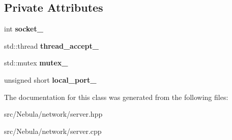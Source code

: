 \subsection*{\-Private \-Attributes}
\begin{DoxyCompactItemize}
\item 
\hypertarget{classgal_1_1network_1_1server_ab30387fed262865c5b4fdaf31127e03f}{int {\bfseries socket\-\_\-}}\label{classgal_1_1network_1_1server_ab30387fed262865c5b4fdaf31127e03f}

\item 
\hypertarget{classgal_1_1network_1_1server_ac269b4e460b0907bb6c12e400bd35b4f}{std\-::thread {\bfseries thread\-\_\-accept\-\_\-}}\label{classgal_1_1network_1_1server_ac269b4e460b0907bb6c12e400bd35b4f}

\item 
\hypertarget{classgal_1_1network_1_1server_aa431c88e212e3d616be9e94f9701e3ee}{std\-::mutex {\bfseries mutex\-\_\-}}\label{classgal_1_1network_1_1server_aa431c88e212e3d616be9e94f9701e3ee}

\item 
\hypertarget{classgal_1_1network_1_1server_acfcf5712d71ffa9b03b0e53a69d68d77}{unsigned short {\bfseries local\-\_\-port\-\_\-}}\label{classgal_1_1network_1_1server_acfcf5712d71ffa9b03b0e53a69d68d77}

\end{DoxyCompactItemize}


\-The documentation for this class was generated from the following files\-:\begin{DoxyCompactItemize}
\item 
src/\-Nebula/network/server.\-hpp\item 
src/\-Nebula/network/server.\-cpp\end{DoxyCompactItemize}
